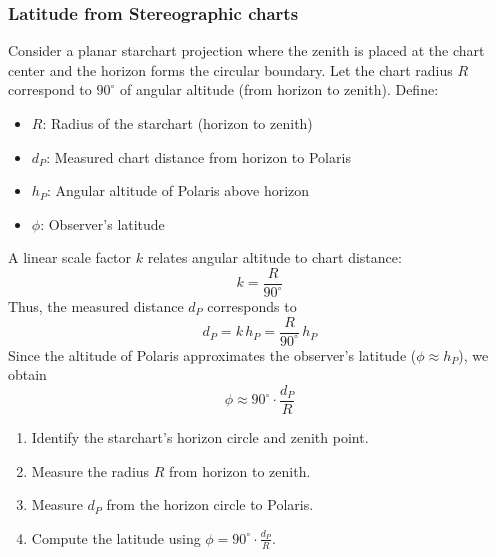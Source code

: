 \documentclass[a4paper,12pt]{extarticle}
\begin{document}
\subsubsection*{Latitude from Stereographic charts}
Consider a planar starchart projection where the zenith is placed at the chart center and the horizon forms the circular boundary. Let the chart radius $R$ correspond to $90^\circ$ of angular altitude (from horizon to zenith). Define:
\begin{itemize}
	\itemsep0em 
	\item $R$: Radius of the starchart (horizon to zenith)
	\item $d_P$: Measured chart distance from horizon to Polaris
	\item $h_P$: Angular altitude of Polaris above horizon
	\item $\phi$: Observer’s latitude
\end{itemize}
A linear scale factor $k$ relates angular altitude to chart distance:
\[k = \frac{R}{90^\circ}\]
Thus, the measured distance $d_P$ corresponds to
\[d_P = k \, h_P = \frac{R}{90^\circ} \, h_P\]
Since the altitude of Polaris approximates the observer’s latitude ($\phi \approx h_P$), we obtain
\[\boxed{\phi \approx 90^\circ \cdot \frac{d_P}{R}}
\]
\begin{enumerate}[Step 1]
	\itemsep0em 
	\item Identify the starchart’s horizon circle and zenith point.
	\item Measure the radius $R$ from horizon to zenith.
	\item Measure $d_P$ from the horizon circle to Polaris.
	\item Compute the latitude using $\displaystyle \phi = 90^\circ \cdot  \frac{d_P}{R}$.
\end{enumerate}
\clearpage
\end{document}
